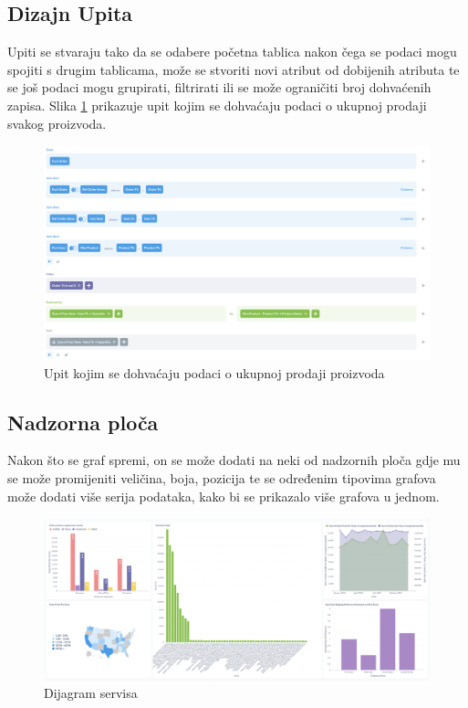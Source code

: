 \documentclass[12pt, oneside]{book}
\begin{document}
\subsection{Dizajn Upita}
Upiti se stvaraju tako da se odabere početna tablica nakon čega se podaci mogu spojiti s drugim tablicama, može se stvoriti novi atribut od dobijenih atributa te se još podaci mogu grupirati, filtrirati ili se može ograničiti broj dohvaćenih zapisa.  Slika \ref{UpitiDizajn} prikazuje upit kojim se dohvaćaju podaci o ukupnoj prodaji svakog proizvoda.


\begin{figure}[H]
\label{UpitiDizajn}
\includegraphics[width=16cm]{images/Metabase-TotalItemsSold-Editor.png}
\centering
\caption{Upit kojim se dohvaćaju podaci o ukupnoj prodaji proizvoda}
\end{figure}


\subsection{Nadzorna ploča}
Nakon što se graf spremi, on se može dodati na neki od nadzornih ploča gdje mu se može promijeniti veličina, boja, pozicija te se određenim tipovima grafova može dodati više serija podataka, kako bi se prikazalo više grafova u jednom.


\begin{figure}[H]
\includegraphics[width=16cm]{images/Metabase-Dasboard.png}
\centering
\caption{Dijagram servisa}
\end{figure}
\end{document}

